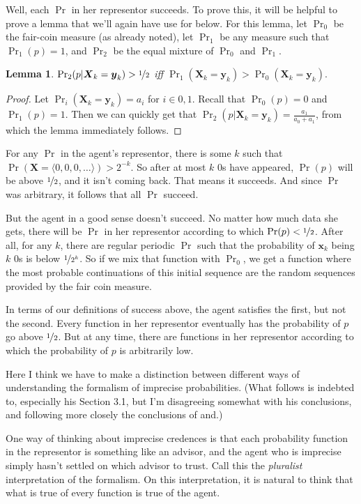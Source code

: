\documentclass{ergoclass}
\newtheorem{lemma}[theorem]{Lemma}
\newcommand{\vx}{\boldsymbol{x}}
\newcommand{\vX}{\boldsymbol{X}}
\newcommand{\vy}{\boldsymbol{y}}
\begin{document}
Well, each $\Pr$ in her representor succeeds. To prove this, it will be helpful to prove a lemma that we'll again have use for below. For this lemma, let $\Pr_0$ be the fair-coin measure (as already noted), let $\Pr_1$ be any measure such that $\Pr_1(p) = 1$, and $\Pr_2$ be the equal mixture of $\Pr_0$ and $\Pr_1$.

\begin{lemma}
\label{Half}
$\Pr_2(p | \vX_k = \vy_k) > \nicefrac{1}{2}$ iff $\Pr_1(\vX_k = \vy_k) > \Pr_0(\vX_k = \vy_k).$
\end{lemma}
\begin{proof}
Let $\Pr_i(\vX_k = \vy_k) = a_i$ for $i \in {0, 1}$. Recall that $\Pr_0(p) = 0$ and $\Pr_1(p) = 1$. Then we can quickly get that $\Pr_2(p | \vX_k = \vy_k) = \frac{a_1}{a_0 + a_1}$, from which the lemma immediately follows. 
\end{proof}

For any $\Pr$ in the agent's representor, there is some $k$ such that $\Pr(\vX = \langle 0, 0, 0, \dots \rangle) > 2^{-k}$. So after at most $k$ 0s have appeared, $\Pr(p)$ will be above $\nicefrac{1}{2}$, and it isn't coming back. That means it succeeds. And since $\Pr$ was arbitrary, it follows that all $\Pr$ succeed.

But the agent in a good sense doesn't succeed. No matter how much data she gets, there will be $\Pr$ in her representor according to which $\Pr(p) < \nicefrac{1}{2}$. After all, for any $k$, there are regular periodic $\Pr$ such that the probability of $\vx_k$ being $k$ 0s is below $\nicefrac{1}{2^k}$. So if we mix that function with $\Pr_0$, we get a function where the most probable continuations of this initial sequence are the random sequences provided by the fair coin measure.

In terms of our definitions of success above, the agent satisfies the first, but not the second. Every function in her representor eventually has the probability of $p$ go above $\nicefrac{1}{2}$. But at any time, there are functions in her representor according to which the probability of $p$ is arbitrarily low. 

Here I think we have to make a distinction between different ways of understanding the formalism of imprecise probabilities. (What follows is indebted to\citealt{Bradley2014}, especially his Section 3.1, but I'm disagreeing somewhat with his conclusions, and following more closely the conclusions of\citealt{Joyce2010}  and\citealt{Schoenfield2012}.) %

One way of thinking about imprecise credences is that each probability function in the representor is something like an advisor, and the agent who is imprecise simply hasn't settled on which advisor to trust. Call this the \textit{pluralist} interpretation of the formalism. On this interpretation, it is natural to think that what is true of every function is true of the agent.
\end{document}
